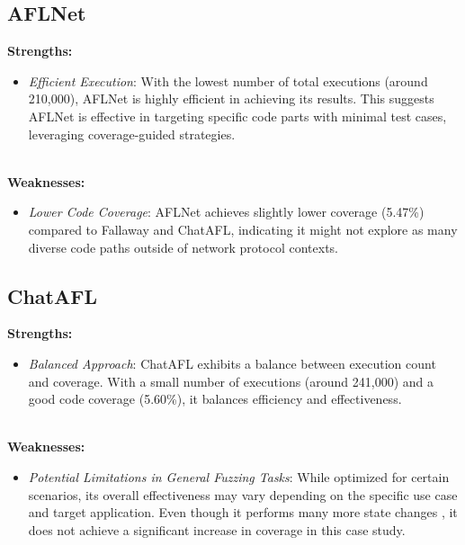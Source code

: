 \subsection{AFLNet}

\textbf{Strengths:}
\begin{itemize}
    \item \textit{Efficient Execution}: With the lowest number of total executions (around 210,000), AFLNet is highly efficient in achieving its results. This suggests AFLNet is effective in targeting specific code parts with minimal test cases, leveraging coverage-guided strategies.
\end{itemize}
\phantom{}\\
\textbf{Weaknesses:}
\begin{itemize}
    \item \textit{Lower Code Coverage}: AFLNet achieves slightly lower coverage (5.47\%) compared to Fallaway and ChatAFL, indicating it might not explore as many diverse code paths outside of network protocol contexts.
\end{itemize}

\subsection{ChatAFL}

\textbf{Strengths:}
\begin{itemize}
    \item \textit{Balanced Approach}: ChatAFL exhibits a balance between execution count and coverage. With a small number of executions (around 241,000) and a good code coverage (5.60\%), it balances efficiency and effectiveness.
\end{itemize}
\phantom{}\\
\textbf{Weaknesses:}
\begin{itemize}
    \item \textit{Potential Limitations in General Fuzzing Tasks}: While optimized for certain scenarios, its overall effectiveness may vary depending on the specific use case and target application. Even though it performs many more state changes \cite{chatafl}, it does not achieve a significant increase in coverage in this case study.
\end{itemize}